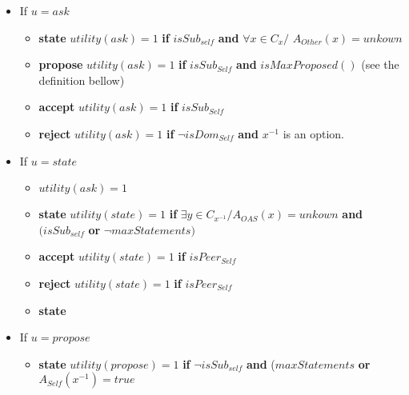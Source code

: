 \documentclass{article}
\begin{document}
	\title{\vskip -10pt}
	
	\author{Lydia Ould Ouali, Charles Rich \and
		Nicolas Sabouret }
	
	
	\begin{abstract}\vskip -20pt
		
	\end{abstract}
	\begin{itemize}
\item If $u =ask $ 
\begin{itemize}
	\item\textbf{state}
	\subitem $utility(ask) = 1$ \textbf{ if } $ isSub_{self}$ \textbf{ and } {$\forall x \in C_{x} /$ $ A_{Other} (x) = unkown$ }

	
	\item \textbf{propose}	
	\subitem $utility(ask) = 1$ \textbf{ if } $isSub_{Self}$ \textbf{ and } $isMaxProposed()$ (see the definition bellow)

	
	\item \textbf{accept}	
	\subitem $utility(ask) = 1$ \textbf{ if } $isSub_{Self}$

	
	\item \textbf{reject}	
	\subitem $utility(ask) =1 $ \textbf{ if } $\neg isDom_{Self}$ \textbf{ and } $x^{-1}$ is an option.

\end{itemize}
\item If $u =state$
\begin{itemize}
		\item $utility(ask) = 1$
		\item \textbf{state}
			\subitem $utility(state) = 1$ \textbf{ if } $ \exists y \in C_{x^{-1}} / A_{OAS} (x) = unkown$ \textbf{ and } $ (isSub_{self}$  \textbf{ or } $\neg maxStatements)$

		\item \textbf{accept}
			\subitem $utility(state) = 1$ \textbf{ if } $isPeer_{Self}$

		\item \textbf{reject}
			\subitem $utility(state) = 1$ \textbf{ if } $isPeer_{Self}$
				\item \textbf{state}
				

\end{itemize}	

	\item If $u =propose$
	\begin{itemize}
		\item \textbf{state}
			\subitem $utility(propose) = 1$ \textbf{ if } $\neg isSub_{self}$ \textbf{ and } ($maxStatements$ \textbf{ or } $A_{Self} (x^{-1}) = true$


\end{itemize}
\end{itemize}
\end{document}
